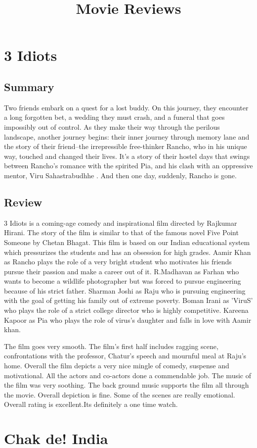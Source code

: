 \documentclass[11pt]{article} %
\title{Movie Reviews}
\author{}
\begin{document}
\maketitle

\section{3 Idiots}
\subsection{Summary}
Two friends embark on a quest for a lost buddy. On this journey, they encounter a long forgotten bet, a wedding they must crash, and a funeral that goes impossibly out of control. As they make their way through the perilous landscape, another journey begins: their inner journey through memory lane and the story of their friend--the irrepressible free-thinker Rancho, who in his unique way, touched and changed their lives. It’s a story of their hostel days that swings between Rancho’s romance with the spirited Pia, and his clash with an oppressive mentor, Viru Sahastrabudhhe . And then one day, suddenly, Rancho is gone.

\subsection{Review}
3 Idiots is a coming-age comedy and inspirational film directed by Rajkumar Hirani. The story of the film is similar to that of the famous novel Five Point Someone by Chetan Bhagat. This film is based on our Indian educational system which pressurizes the students and has an obsession for high grades.  Aamir Khan as Rancho plays the role of a very bright student who motivates his friends pursue their passion and make a career out of it. R.Madhavan as Farhan who wants to become a wildlife photographer but was forced to pursue engineering because of his strict father. Sharman Joshi as Raju who is pursuing engineering with the goal of getting his family out of extreme poverty. Boman Irani as 'ViruS' who plays the role of a strict college director who is highly competitive. Kareena Kapoor as Pia who plays the role of virus’s daughter and falls in love with Aamir khan.

The film goes very smooth. The film’s first half includes ragging scene, confrontations with the professor, Chatur’s speech and mournful meal at Raju’s home. Overall the film depicts a very nice mingle of comedy, suspense and motivational. All the actors and co-actors done a commendable job. The music of the film was very soothing. The back ground music supports the film all through the movie. Overall depiction is fine. Some of the scenes are really emotional. Overall rating is excellent.Its definitely a one time watch.

\section{Chak de! India}
\end{document}
